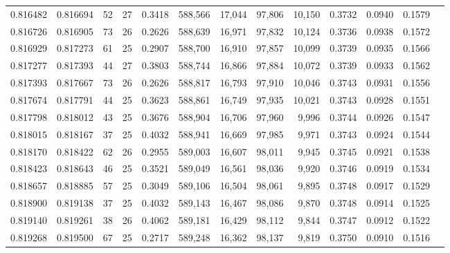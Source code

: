 \begin{tabular}{rrrrrrrrrrrrr}
0.816482 & 0.816694 &    52 &  27 &                                     0.3418 & 588,566 &  17,044 &  97,806 &  10,150 & 0.3732 & 0.0940 & 0.1579 \\
0.816726 & 0.816905 &    73 &  26 &                                     0.2626 & 588,639 &  16,971 &  97,832 &  10,124 & 0.3736 & 0.0938 & 0.1572 \\
0.816929 & 0.817273 &    61 &  25 &                                     0.2907 & 588,700 &  16,910 &  97,857 &  10,099 & 0.3739 & 0.0935 & 0.1566 \\
0.817277 & 0.817393 &    44 &  27 &                                     0.3803 & 588,744 &  16,866 &  97,884 &  10,072 & 0.3739 & 0.0933 & 0.1562 \\
0.817393 & 0.817667 &    73 &  26 &                                     0.2626 & 588,817 &  16,793 &  97,910 &  10,046 & 0.3743 & 0.0931 & 0.1556 \\
0.817674 & 0.817791 &    44 &  25 &                                     0.3623 & 588,861 &  16,749 &  97,935 &  10,021 & 0.3743 & 0.0928 & 0.1551 \\
0.817798 & 0.818012 &    43 &  25 &                                     0.3676 & 588,904 &  16,706 &  97,960 &   9,996 & 0.3744 & 0.0926 & 0.1547 \\
0.818015 & 0.818167 &    37 &  25 &                                     0.4032 & 588,941 &  16,669 &  97,985 &   9,971 & 0.3743 & 0.0924 & 0.1544 \\
0.818170 & 0.818422 &    62 &  26 &                                     0.2955 & 589,003 &  16,607 &  98,011 &   9,945 & 0.3745 & 0.0921 & 0.1538 \\
0.818423 & 0.818643 &    46 &  25 &                                     0.3521 & 589,049 &  16,561 &  98,036 &   9,920 & 0.3746 & 0.0919 & 0.1534 \\
0.818657 & 0.818885 &    57 &  25 &                                     0.3049 & 589,106 &  16,504 &  98,061 &   9,895 & 0.3748 & 0.0917 & 0.1529 \\
0.818900 & 0.819138 &    37 &  25 &                                     0.4032 & 589,143 &  16,467 &  98,086 &   9,870 & 0.3748 & 0.0914 & 0.1525 \\
0.819140 & 0.819261 &    38 &  26 &                                     0.4062 & 589,181 &  16,429 &  98,112 &   9,844 & 0.3747 & 0.0912 & 0.1522 \\
0.819268 & 0.819500 &    67 &  25 &                                     0.2717 & 589,248 &  16,362 &  98,137 &   9,819 & 0.3750 & 0.0910 & 0.1516 \\

\end{tabular}
